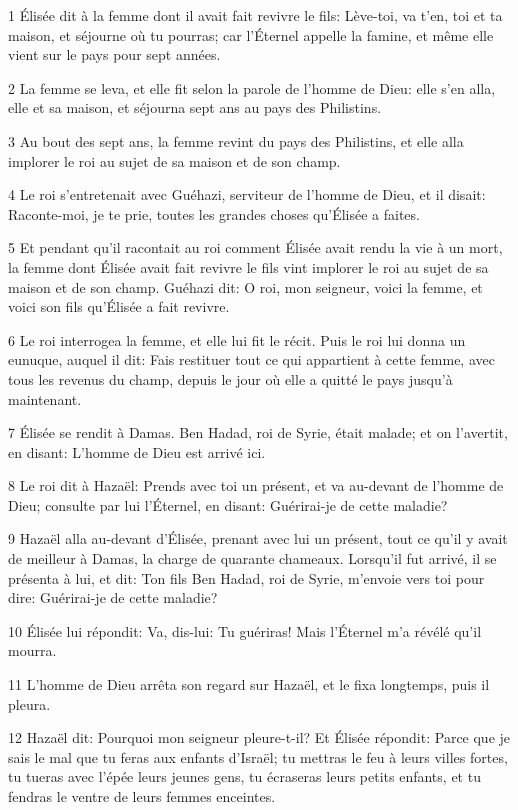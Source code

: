 \par 1 Élisée dit à la femme dont il avait fait revivre le fils: Lève-toi, va t'en, toi et ta maison, et séjourne où tu pourras; car l'Éternel appelle la famine, et même elle vient sur le pays pour sept années.
\par 2 La femme se leva, et elle fit selon la parole de l'homme de Dieu: elle s'en alla, elle et sa maison, et séjourna sept ans au pays des Philistins.
\par 3 Au bout des sept ans, la femme revint du pays des Philistins, et elle alla implorer le roi au sujet de sa maison et de son champ.
\par 4 Le roi s'entretenait avec Guéhazi, serviteur de l'homme de Dieu, et il disait: Raconte-moi, je te prie, toutes les grandes choses qu'Élisée a faites.
\par 5 Et pendant qu'il racontait au roi comment Élisée avait rendu la vie à un mort, la femme dont Élisée avait fait revivre le fils vint implorer le roi au sujet de sa maison et de son champ. Guéhazi dit: O roi, mon seigneur, voici la femme, et voici son fils qu'Élisée a fait revivre.
\par 6 Le roi interrogea la femme, et elle lui fit le récit. Puis le roi lui donna un eunuque, auquel il dit: Fais restituer tout ce qui appartient à cette femme, avec tous les revenus du champ, depuis le jour où elle a quitté le pays jusqu'à maintenant.
\par 7 Élisée se rendit à Damas. Ben Hadad, roi de Syrie, était malade; et on l'avertit, en disant: L'homme de Dieu est arrivé ici.
\par 8 Le roi dit à Hazaël: Prends avec toi un présent, et va au-devant de l'homme de Dieu; consulte par lui l'Éternel, en disant: Guérirai-je de cette maladie?
\par 9 Hazaël alla au-devant d'Élisée, prenant avec lui un présent, tout ce qu'il y avait de meilleur à Damas, la charge de quarante chameaux. Lorsqu'il fut arrivé, il se présenta à lui, et dit: Ton fils Ben Hadad, roi de Syrie, m'envoie vers toi pour dire: Guérirai-je de cette maladie?
\par 10 Élisée lui répondit: Va, dis-lui: Tu guériras! Mais l'Éternel m'a révélé qu'il mourra.
\par 11 L'homme de Dieu arrêta son regard sur Hazaël, et le fixa longtemps, puis il pleura.
\par 12 Hazaël dit: Pourquoi mon seigneur pleure-t-il? Et Élisée répondit: Parce que je sais le mal que tu feras aux enfants d'Israël; tu mettras le feu à leurs villes fortes, tu tueras avec l'épée leurs jeunes gens, tu écraseras leurs petits enfants, et tu fendras le ventre de leurs femmes enceintes.
